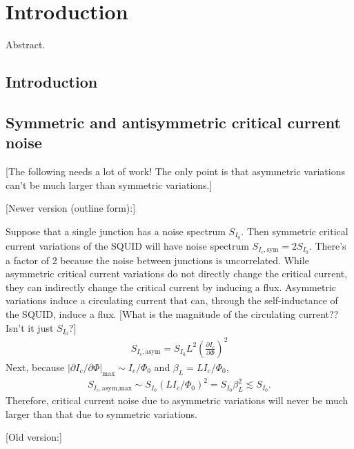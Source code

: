 \chapter{Introduction}
\label{chap:intro}

Abstract.

\section{Introduction}



\section{Symmetric and antisymmetric critical current noise} \label{Sec:sym_asym_Ic_noise}

[The following needs a lot of work! The only point is that asymmetric variations can't be much larger than symmetric variations.]

[Newer version (outline form):]

Suppose that a single junction has a noise spectrum $S_{I_0}$. Then symmetric critical current variations of the SQUID will have noise spectrum $S_{I_c,\text{sym}} = 2S_{I_0}$. There's a factor of 2 because the noise between junctions is uncorrelated. While asymmetric critical current variations do not directly change the critical current, they can indirectly change the critical current by inducing a flux. Asymmetric variations induce a circulating current that can, through the self-inductance of the SQUID, induce a flux. [What is the magnitude of the circulating current?? Isn't it just $S_{I_0}$?]
\begin{align}\label{blah}
S_{I_c,\text{asym}} = S_{I_0} L^2 \left(\frac{\partial I_c}{\partial \Phi}\right)^2
\end{align}
Next, because $|\partial I_c/\partial \Phi|_\text{max} \sim I_c/\Phi_0$ and $\beta_L = L I_c/\Phi_0$,
\begin{align}\label{blah}
S_{I_c,\text{asym,max}} \sim S_{I_0} (L I_c/\Phi_0)^2 = S_{I_0} \beta_L^2 \lesssim S_{I_0}.
\end{align}
Therefore, critical current noise due to asymmetric variations will never be much larger than that due to symmetric variations.

[Old version:]

